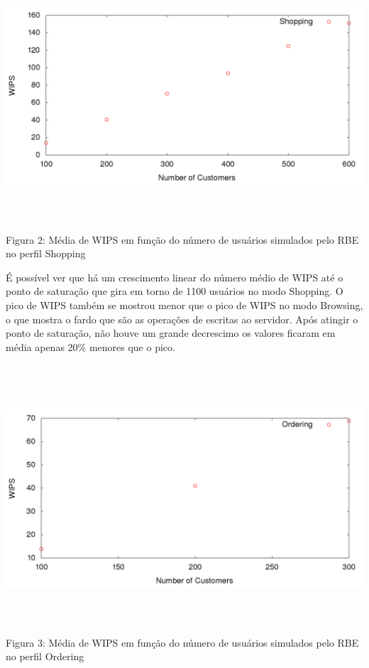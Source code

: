 \documentclass[11pt,twoside]{article}
\begin{document}
\begin{center}
\includegraphics[width=15cm, height=10cm]{images/plot_2_shopping}
Figura 2: M\'edia de WIPS em fun\c{c}\~ao do n\'umero de usu\'arios simulados pelo RBE no perfil Shopping
\end{center}

\'E poss\'ivel ver que h\'a um crescimento linear do n\'umero m\'edio de WIPS at\'e o ponto de satura\c{c}\~ao que gira em torno de 1100 usu\'arios no modo Shopping. O pico de WIPS tamb\'em se mostrou menor que o pico de WIPS no modo Browsing, o que mostra o fardo que s\~ao as opera\c{c}\~oes de escritas ao servidor. Ap\'os atingir o ponto de satura\c{c}\~ao, n\~ao houve um grande decrescimo os valores ficaram em m\'edia apenas 20\% menores que o pico.

\begin{center}
\includegraphics[width=15cm, height=10cm]{images/plot_3_ordering}
Figura 3: M\'edia de WIPS em fun\c{c}\~ao do n\'umero de usu\'arios simulados pelo RBE no perfil Ordering
\end{center}
\end{document}
